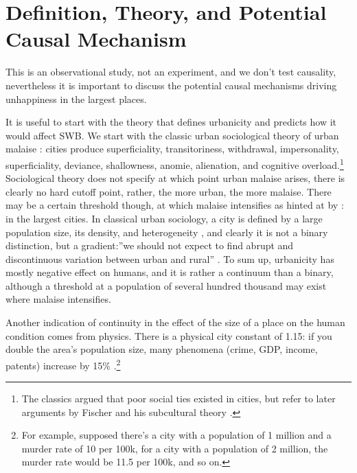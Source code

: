 \documentclass[10pt, letterpaper]{article}
\begin{document}
\section*{Definition, Theory, and Potential Causal Mechanism}

This is an observational study, not an experiment, and we don't test causality, nevertheless it is important to discuss the potential causal mechanisms driving unhappiness in the largest places.

It is useful to start with the theory that defines urbanicity and predicts how it would affect SWB. 
We start with the classic urban sociological theory of urban malaise
 \citep{tonnies57,wirth38,simmel03,park15,park84}: cities produce superficiality,
transitoriness, withdrawal, impersonality, superficiality, deviance,
shallowness, anomie, alienation, and cognitive overload.\footnote{The classics
  argued that poor social ties existed in cities, but refer to later arguments by Fischer and his subcultural theory \citep{fischer95,fischer75,fischer72}.} 
Sociological theory does not specify at which point urban malaise arises, there is clearly no hard
cutoff point, rather, the more urban, the more malaise. There may be a certain
threshold though, at which malaise intensifies as hinted at by
\citet{fischer73}: in the largest cities.
In classical urban sociology, a city is defined by a large population size, its density,
and heterogeneity \citep{wirth38}, and clearly it is not a binary distinction,
but a gradient:''we should not expect to find abrupt and discontinuous variation
between urban and rural'' \citep[][p. 2]{wirth38}. To sum up, urbanicity has mostly negative
effect on humans, and it is rather a continuum than a binary, although a threshold
at a population of several hundred thousand may exist where malaise intensifies.

Another indication of continuity in the effect of the size of a place on the human condition
comes from physics. There is a physical city constant of 1.15: if you double the area's population size, many phenomena (crime, GDP, income, patents) increase by 15\% \citep{blissCL_nov4_14,bettencourt10,bettencourt10b,bettencourt07}.\footnote{For example, supposed there's a city with a population of 1 million and a murder rate of 10 per 100k, for a city with a population of 2 million, the murder rate would be 11.5 per 100k, and so on.} 
\end{document}

